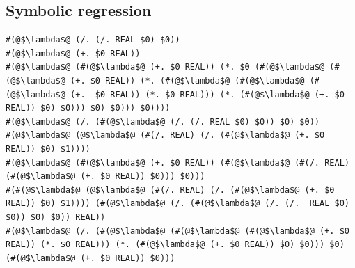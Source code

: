 \documentclass{article}
\begin{document}
\subsection{Symbolic regression}
\begin{lstlisting}
#(@$\lambda$@ (/. (/. REAL $0) $0))
#(@$\lambda$@ (+. $0 REAL))
#(@$\lambda$@ (#(@$\lambda$@ (+. $0 REAL)) (*. $0 (#(@$\lambda$@ (#(@$\lambda$@ (+. $0 REAL)) (*. (#(@$\lambda$@ (#(@$\lambda$@ (#(@$\lambda$@ (+.  $0 REAL)) (*. $0 REAL))) (*. (#(@$\lambda$@ (+. $0 REAL)) $0) $0))) $0) $0))) $0))))
#(@$\lambda$@ (/. (#(@$\lambda$@ (/. (/. REAL $0) $0)) $0) $0))
#(@$\lambda$@ (@$\lambda$@ (#(/. REAL) (/. (#(@$\lambda$@ (+. $0 REAL)) $0) $1))))
#(@$\lambda$@ (#(@$\lambda$@ (+. $0 REAL)) (#(@$\lambda$@ (#(/. REAL) (#(@$\lambda$@ (+. $0 REAL)) $0))) $0)))
#(#(@$\lambda$@ (@$\lambda$@ (#(/. REAL) (/. (#(@$\lambda$@ (+. $0 REAL)) $0) $1)))) (#(@$\lambda$@ (/. (#(@$\lambda$@ (/. (/.  REAL $0) $0)) $0) $0)) REAL))
#(@$\lambda$@ (/. (#(@$\lambda$@ (#(@$\lambda$@ (#(@$\lambda$@ (+. $0 REAL)) (*. $0 REAL))) (*. (#(@$\lambda$@ (+. $0 REAL)) $0) $0))) $0) (#(@$\lambda$@ (+. $0 REAL)) $0)))
\end{lstlisting}
\end{document}
